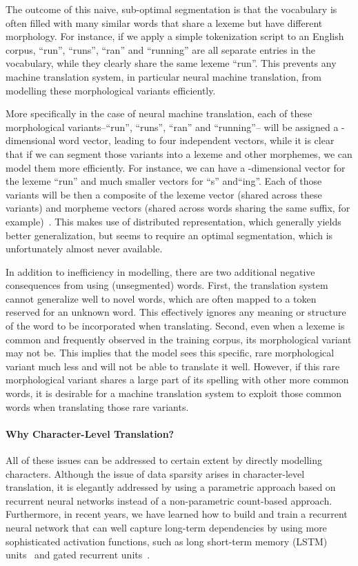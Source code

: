 \documentclass[11pt]{article}
\begin{document}
The outcome of this naive, sub-optimal segmentation is that the vocabulary is
often filled with many similar words that share a lexeme but have different
morphology. For instance, if we apply a simple tokenization script to an English
corpus, ``run'', ``runs'', ``ran'' and ``running'' are all separate entries in
the vocabulary, while they clearly share the same lexeme ``run''. This prevents
any machine translation system, in particular neural machine translation, from
modelling these morphological variants efficiently. 

More specifically in the case of neural machine translation, each of these
morphological variants--``run'', ``runs'', ``ran'' and ``running''-- will be
assigned a -dimensional word vector, leading to four independent vectors,
while it is clear that if we can segment those variants into a lexeme and other
morphemes, we can model them more efficiently. For instance, we can have a
-dimensional vector for the lexeme ``run'' and much smaller vectors for ``s''
and``ing''.  Each of those variants will be then a composite of the lexeme
vector (shared across these variants) and morpheme vectors
(shared across words sharing the same suffix, for example)~\cite{botha2014compositional}. This
makes use of distributed representation, which generally yields better generalization, but seems
to require an optimal segmentation, which is unfortunately almost never available.

In addition to inefficiency in modelling, there are two additional negative
consequences from using (unsegmented) words. First, the translation system
cannot generalize well to novel words, which are often mapped to a token reserved for an unknown word.
This effectively ignores any meaning or structure of the word to be
incorporated when translating. Second, even when a lexeme is common and
frequently observed in the training corpus, its morphological variant may not be.
This implies that the model sees this specific, rare morphological variant much
less and will not be able to translate it well.  However, if this rare
morphological variant shares a large part of its spelling with other more common
words, it is desirable for a machine translation system to exploit those common
words when translating those rare variants.

\paragraph{Why Character-Level Translation?}
All of these issues can be addressed to certain extent by directly modelling
characters. Although the issue of data sparsity arises in
character-level translation, it is elegantly addressed by using a parametric
approach based on recurrent neural networks instead of a non-parametric
count-based approach. Furthermore, in recent years, we have learned how to build
and train a recurrent neural network that can well capture long-term
dependencies by using more sophisticated activation functions, such as 
long short-term memory (LSTM) units~\cite{hochreiter1997long} and gated recurrent units~\cite{Cho-et-al-EMNLP2014}.
\end{document}
